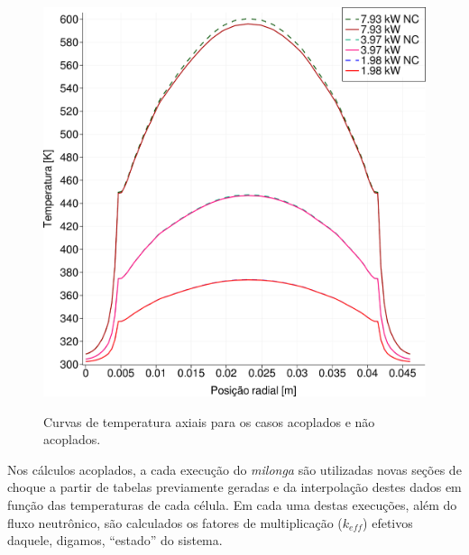 \begin{figure}[htb]
  \caption{Curvas de temperatura axiais para os casos acoplados e não acoplados.}
  \centering\includegraphics[scale=0.5]{figuras/T_x_all_square_port.png}
  \label{fig:T_all_x}
\end{figure}

Nos cálculos acoplados, a cada execução do \textit{milonga} são utilizadas
novas seções de choque a partir de tabelas previamente geradas e da interpolação
destes dados em função das temperaturas de cada célula. Em cada uma destas
execuções, além do fluxo neutrônico, são calculados os fatores de multiplicação
($k_{eff}$) efetivos daquele, digamos, ``estado'' do sistema.

